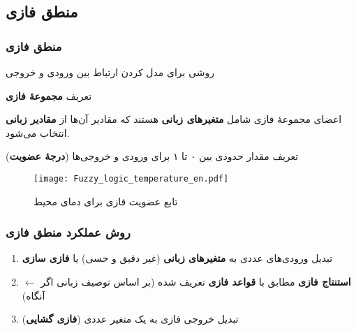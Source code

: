 \documentclass[xcolor=dvipsnames, professionalfonts, aspectratio=169, 11pt]{beamer}
\begin{document}
\subsection{منطق فازی}
\begin{frame}[allowframebreaks]
    \frametitle{منطق فازی}

    \begin{moredi}
        \item روشی برای مدل کردن ارتباط بین ورودی و خروجی
        \item تعریف \textbf{مجموعهٔ فازی}
        \item اعضای مجموعهٔ فازی شامل \textbf{متغیرهای زبانی} هستند که مقادیر آن‌ها از \textbf{مقادیر زبانی} انتخاب می‌شود.
        \item تعریف مقدار حدودی بین ۰ تا ۱ برای ورودی و خروجی‌ها (\textbf{درجهٔ عضویت})
    \end{moredi}

    \begin{figure}[ht]
        \centering
        \texttt{[image: Fuzzy\_logic\_temperature\_en.pdf]}
        \caption{تابع عضویت فازی برای دمای محیط}
        \label{fig:fuzzy-logic-temperature}
    \end{figure}

\end{frame}

\begin{frame}
    \frametitle{روش عملکرد منطق فازی}

    \begin{enumerate}\RTList
        \item تبدیل ورودی‌های عددی به \textbf{متغیرهای زبانی} (غیر دقیق و حسی) یا \textbf{فازی سازی}
        \item \textbf{استنتاج فازی} مطابق با \textbf{قواعد فازی} تعریف شده (بر اساس توصیف زبانی اگر $\leftarrow$ آنگاه)
        \item تبدیل خروجی فازی به یک متغیر عددی (\textbf{فازی گشایی})
    \end{enumerate}

\end{frame}
\end{document}
